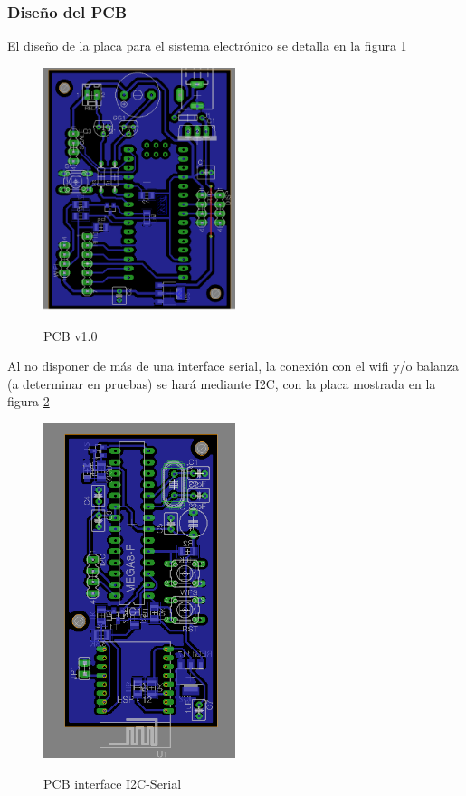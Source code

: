 \subsubsection{Dise\~no del PCB}
El dise\~no de la placa para el sistema electr\'onico se detalla en la figura \ref{fig:pcb}
\begin{figure}[h!]
	\caption{PCB v1.0}
	\includegraphics[width=0.5\textwidth]{images/weightlogger_pcb}
	\label{fig:pcb}
\end{figure}

Al no disponer de más de una interface serial, la conexión con el wifi y/o balanza (a determinar en pruebas) 
se hará mediante I2C, con la placa mostrada en la figura \ref{fig:pcb-i2c}
\begin{figure}[h!]
  \caption{PCB interface I2C-Serial}
  \includegraphics[width=0.5\textwidth]{images/interface-i2c-wifi.png}
  \label{fig:pcb-i2c}
\end{figure}

